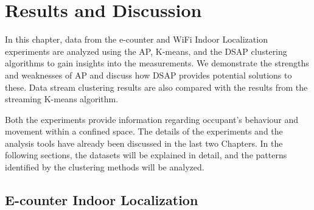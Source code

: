 \documentclass[../UNBThesis2.tex]{subfiles}
\begin{document}
\chapter{Results and Discussion}

In this chapter, data from the e-counter and WiFi Indoor Localization experiments are analyzed using the AP, K-means, and the DSAP clustering algorithms to gain insights into the measurements. We demonstrate the strengths and weaknesses of AP and discuss how DSAP provides potential solutions to these. Data stream clustering results are also compared with the results from the streaming K-means algorithm. 

Both the experiments provide information regarding occupant's behaviour and movement within a confined space. The details of the experiments and the analysis tools have already been discussed in the last two Chapters. In the following sections, the datasets will be explained in detail, and the patterns identified by the clustering methods will be analyzed.

 
\section{E-counter Indoor Localization }
\end{document}
